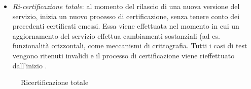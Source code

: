 \documentclass[../main.tex]{subfiles}
\begin{document}
\begin{itemize}
\item \textit{Ri-certificazione totale}: al momento del rilascio di una nuova versione del servizio, inizia un nuovo processo di certificazione, senza tenere conto dei precedenti certificati emessi.
Essa viene effettuata nel momento in cui un aggiornamento del servizio effettua cambiamenti sostanziali (ad es. funzionalità orizzontali, come meccanismi di crittografia. Tutti i casi di test vengono ritenuti invalidi e il processo di certificazione viene rieffettuato dall'inizio \cite{CertEvolutiva}.
\end{itemize}

\begin{figure}[H]
   \centering
   \caption{Ricertificazione totale \cite{CertEvolutiva}}\label{fig:FullRecert}
\end{figure}
\vfill
\newpage




\end{document}
